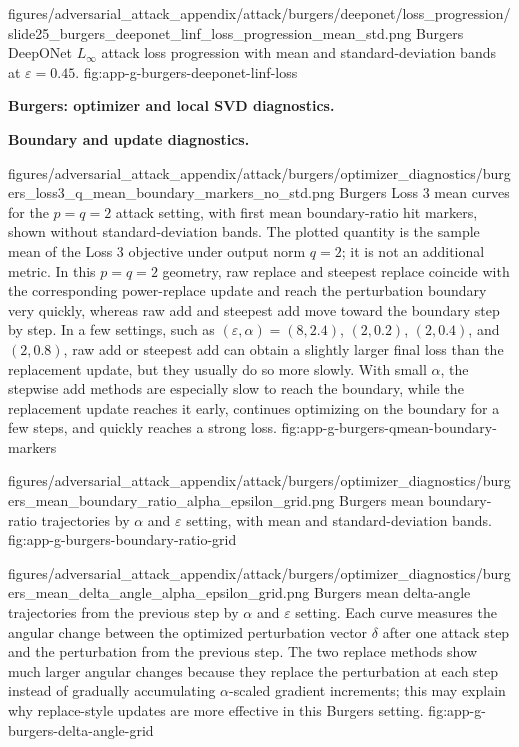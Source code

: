 \documentclass[letterpaper]{article} %
\begin{document}
\appendixattackfig
  {figures/adversarial_attack_appendix/attack/burgers/deeponet/loss_progression/slide25_burgers_deeponet_linf_loss_progression_mean_std.png}
  {Burgers DeepONet $L_\infty$ attack loss progression with mean and
  standard-deviation bands at $\varepsilon=0.45$.}
  {fig:app-g-burgers-deeponet-linf-loss}

\clearpage
\noindent\textbf{Burgers: optimizer and local SVD diagnostics.}

\noindent\textbf{Boundary and update diagnostics.}

\appendixattackfig
  {figures/adversarial_attack_appendix/attack/burgers/optimizer_diagnostics/burgers_loss3_q_mean_boundary_markers_no_std.png}
  {Burgers Loss 3 mean curves for the $p=q=2$ attack setting, with first mean
  boundary-ratio hit markers, shown without standard-deviation bands. The
  plotted quantity is the sample mean of the Loss 3 objective under output
  norm $q=2$; it is not an additional metric. In this $p=q=2$ geometry, raw
  replace and steepest replace coincide with the corresponding power-replace
  update and reach the
  perturbation boundary very quickly, whereas raw add and steepest add move
  toward the boundary step by step. In a few settings, such as
  $(\varepsilon,\alpha)=(8,2.4)$, $(2,0.2)$, $(2,0.4)$, and $(2,0.8)$, raw add or
  steepest add can obtain a slightly larger final loss than the replacement
  update, but they usually do so more slowly. With small $\alpha$, the stepwise
  add methods are especially slow to reach the boundary, while the replacement
  update reaches it early, continues optimizing on the boundary for a few steps,
  and quickly reaches a strong loss.}
  {fig:app-g-burgers-qmean-boundary-markers}

\appendixattackfig
  {figures/adversarial_attack_appendix/attack/burgers/optimizer_diagnostics/burgers_mean_boundary_ratio_alpha_epsilon_grid.png}
  {Burgers mean boundary-ratio trajectories by $\alpha$ and $\varepsilon$ setting,
  with mean and standard-deviation bands.}
  {fig:app-g-burgers-boundary-ratio-grid}

\appendixattackfig
  {figures/adversarial_attack_appendix/attack/burgers/optimizer_diagnostics/burgers_mean_delta_angle_alpha_epsilon_grid.png}
  {Burgers mean delta-angle trajectories from the previous step by $\alpha$ and
  $\varepsilon$ setting. Each curve measures the angular change between the
  optimized perturbation vector $\delta$ after one attack step and the
  perturbation from the previous step. The two replace methods show much larger
  angular changes because they replace the perturbation at each step instead of
  gradually accumulating $\alpha$-scaled gradient increments; this may explain
  why replace-style updates are more effective in this Burgers setting.}
  {fig:app-g-burgers-delta-angle-grid}
\end{document}
